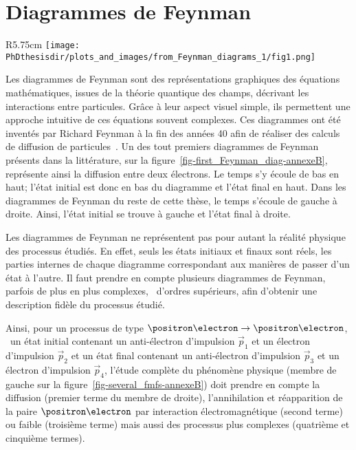 \chapter{Diagrammes de Feynman}\label{annexe-fmf}
\begin{wrapfigure}{R}{5.75cm}
\centering
\texttt{[image: \\PhDthesisdir/plots\_and\_images/from\_Feynman\_diagrams\_1/fig1.png]}
\caption[Diagramme de Feynman de la diffusion électron-électron.]{Diagramme de Feynman de la diffusion électron-électron présenté dans la référence~\cite{Feynman_diagrams_1}.}
\label{fig-first_Feynman_diag-annexeB}
\end{wrapfigure}
Les diagrammes de Feynman sont des représentations graphiques des équations mathématiques, issues de la théorie quantique des champs, décrivant les interactions entre particules.
Grâce à leur aspect visuel simple, ils permettent une approche intuitive de ces équations souvent complexes.
Ces diagrammes ont été inventés par Richard Feynman à la fin des années 40 afin de réaliser des calculs de diffusion de particules~\cite{Feynman_diagrams_1}.
Un des tout premiers diagrammes de Feynman présents dans la littérature, sur la figure~\ref{fig-first_Feynman_diag-annexeB}, représente ainsi la diffusion entre deux électrons.
Le temps s'y écoule de bas en haut; l'état initial est donc en bas du diagramme et l'état final en haut.
Dans les diagrammes de Feynman du reste de cette thèse, le temps s'écoule de gauche à droite.
Ainsi, l'état initial se trouve à gauche et l'état final à droite.
\par Les diagrammes de Feynman ne représentent pas pour autant la réalité physique des processus étudiés.
En effet, seuls les états initiaux et finaux sont réels, les parties internes de chaque diagramme correspondant aux manières de passer d'un état à l'autre.
Il faut prendre en compte plusieurs diagrammes de Feynman, parfois de plus en plus complexes, \ie\ d'ordres supérieurs, afin d'obtenir une description fidèle du processus étudié.
\par Ainsi, pour un processus de type $\positron\electron\to\positron\electron$, \ie\
un état initial contenant
un anti-électron d'impulsion $\vec{p}_1$
et
un électron d'impulsion $\vec{p}_2$
et
un état final contenant
un anti-électron d'impulsion $\vec{p}_3$
et
un électron d'impulsion $\vec{p}_4$,
l'étude complète du phénomène physique (membre de gauche sur la figure~\ref{fig-several_fmfs-annexeB}) doit prendre en compte la diffusion (premier terme du membre de droite), l'annihilation et réapparition de la paire $\positron\electron$ par interaction électromagnétique (second terme) ou faible (troisième terme) mais aussi des processus plus complexes (quatrième et cinquième termes).

